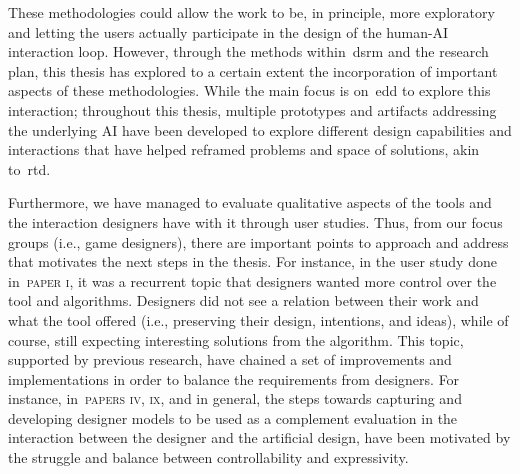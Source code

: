 
These methodologies could allow the work to be, in principle, more exploratory and letting the users actually participate in the design of the human-AI interaction loop. However, through the methods within~\acrshort{dsrm} and the research plan, this thesis has explored to a certain extent the incorporation of important aspects of these methodologies. While the main focus is on~\acrshort{edd} to explore this interaction; throughout this thesis, multiple prototypes and artifacts addressing the underlying AI have been developed to explore different design capabilities and interactions that have helped reframed problems and space of solutions, akin to~\acrshort{rtd}.

Furthermore, we have managed to evaluate qualitative aspects of the tools and the interaction designers have with it through user studies. Thus, from our focus groups (i.e., game designers), there are important points to approach and address that motivates the next steps in the thesis. For instance, in the user study done in~\textsc{paper i}, it was a recurrent topic that designers wanted more control over the tool and algorithms. Designers did not see a relation between their work and what the tool offered (i.e., preserving their design, intentions, and ideas), while of course, still expecting interesting solutions from the algorithm. This topic, supported by previous research, have chained a set of improvements and implementations in order to balance the requirements from designers. For instance, in~\textsc{papers iv, ix}, and in general, the steps towards capturing and developing designer models to be used as a complement evaluation in the interaction between the designer and the artificial design, have been motivated by the struggle and balance between controllability and expressivity.  

